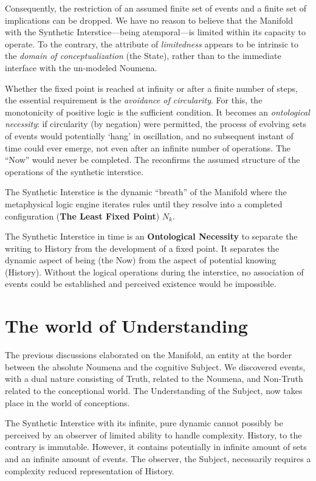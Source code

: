 \documentclass[11pt, a4paper]{article}
\theoremstyle{formalism}
\begin{document}
Consequently, the restriction of an assumed finite set of events and a finite
set of implications can be dropped. We have no reason to believe that the
Manifold with the Synthetic Interstice---being atemporal---is limited within
its capacity to operate. To the contrary, the attribute of \textit{limitedness}
appears to be intrinsic to the {\it domain of conceptualization\/} (the State),
rather than to the immediate interface with the un-modeled Noumena.

Whether the fixed point is reached at infinity or after a finite number of
steps, the essential requirement is the \textit{avoidance of circularity}. For
this, the monotonicity of positive logic is the sufficient condition. It
becomes an \textit{ontological necessity}: if circularity (by negation) were permitted, the
process of evolving sets of events would potentially `hang' in oscillation, and
no subsequent instant of time could ever emerge, not even after an infinite
number of operations. The ``Now'' would never be completed. The reconfirms
the assumed structure of the operations of the synthetic interstice.

The Synthetic Interstice is the dynamic ``breath'' of the Manifold where the
metaphysical logic engine iterates rules until they resolve into a completed
configuration (\textbf{The Least Fixed Point}) $N_k$. 

The Synthetic Interstice in time is an \textbf{Ontological Necessity} to
separate the writing to History from the development of a fixed point. It
separates the dynamic aspect of being (the Now) from the aspect of potential
knowing (History). Without the logical operations during the interstice, no
association of events could be established and perceived existence would
be impossible. 

\section{The world of Understanding}

The previous discussions elaborated on the Manifold, an entity at the border
between the absolute Noumena and the cognitive Subject. We discovered events,
with a dual nature consisting of Truth, related to the Noumena, and
Non-Truth related to the conceptional world. The Understanding of the Subject,
now takes place in the world of conceptions.

The Synthetic Interstice with its infinite, pure dynamic cannot possibly be
perceived by an observer of limited ability to handle complexity. History, to
the contrary is immutable. However, it contains potentially in infinite amount
of sets and an infinite amount of events. The observer, the Subject,
necessarily requires a complexity reduced representation of History.
\end{document}
